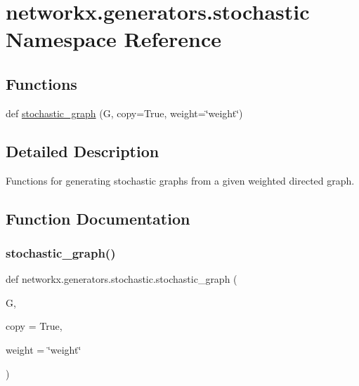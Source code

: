 \hypertarget{namespacenetworkx_1_1generators_1_1stochastic}{}\section{networkx.\+generators.\+stochastic Namespace Reference}
\label{namespacenetworkx_1_1generators_1_1stochastic}
\subsection*{Functions}
\begin{DoxyCompactItemize}
\item 
def \hyperlink{namespacenetworkx_1_1generators_1_1stochastic_a82855a44e07c27e2b0f699b3148742a5}{stochastic\+\_\+graph} (G, copy=True, weight=\char`\"{}weight\char`\"{})
\end{DoxyCompactItemize}


\subsection{Detailed Description}
\begin{DoxyVerb}Functions for generating stochastic graphs from a given weighted directed
graph.\end{DoxyVerb}
 

\subsection{Function Documentation}
\mbox{\label{namespacenetworkx_1_1generators_1_1stochastic_a82855a44e07c27e2b0f699b3148742a5}} 
\subsubsection{\texorpdfstring{stochastic\+\_\+graph()}{stochastic\_graph()}}
{\footnotesize\ttfamily def networkx.\+generators.\+stochastic.\+stochastic\+\_\+graph (\begin{DoxyParamCaption}\item[{}]{G,  }\item[{}]{copy = {\ttfamily True},  }\item[{}]{weight = {\ttfamily \char`\"{}weight\char`\"{}} }\end{DoxyParamCaption})}

